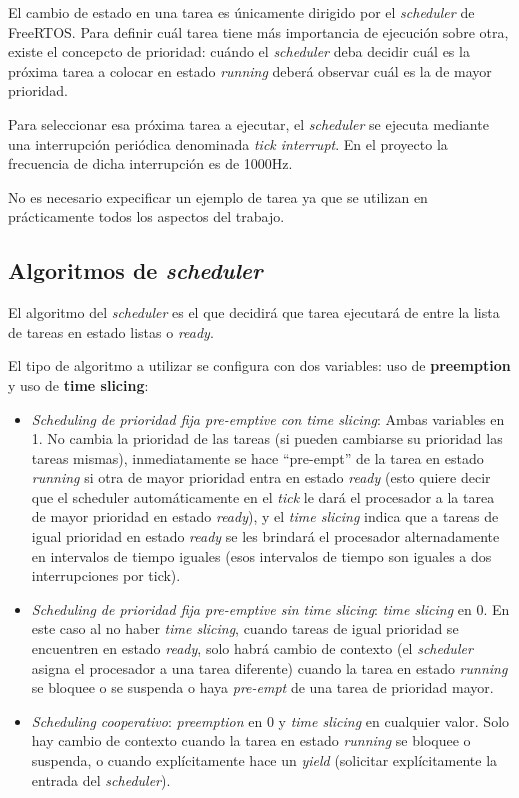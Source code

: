 \documentclass{IEEEtran}
\begin{document}
El cambio de estado en una tarea es únicamente dirigido por el \textit{scheduler} de FreeRTOS. Para definir cuál tarea tiene más importancia de ejecución sobre otra, existe el concepcto de prioridad: cuándo el \textit{scheduler} deba decidir cuál es la próxima tarea a colocar en estado \textit{running} deberá observar cuál es la de mayor prioridad.

Para seleccionar esa próxima tarea a ejecutar, el \textit{scheduler} se ejecuta mediante una interrupción periódica denominada \textit{tick interrupt}. En el proyecto la frecuencia de dicha interrupción es de 1000Hz.

No es necesario expecificar un ejemplo de tarea ya que se utilizan en prácticamente todos los aspectos del trabajo.

\subsection{Algoritmos de \textit{scheduler}}
El algoritmo del \textit{scheduler} es el que decidirá que tarea ejecutará de entre la lista de tareas en estado listas o \textit{ready}.

El tipo de algoritmo a utilizar se configura con dos variables: uso de \textbf{preemption} y uso de \textbf{time slicing}:

\begin{itemize}
    \item \textit{Scheduling de prioridad fija pre-emptive con time slicing}: Ambas variables en 1. No cambia la prioridad de las tareas (si pueden cambiarse su prioridad las tareas mismas), inmediatamente se hace ``pre-empt'' de la tarea en estado \textit{running} si otra de mayor prioridad entra en estado \textit{ready} (esto quiere decir que el scheduler automáticamente en el \textit{tick} le dará el procesador a la tarea de mayor prioridad en estado \textit{ready}), y el \textit{time slicing} indica que a tareas de igual prioridad en estado \textit{ready} se les brindará el procesador alternadamente en intervalos de tiempo iguales (esos intervalos de tiempo son iguales a dos interrupciones por tick).
    \item \textit{Scheduling de prioridad fija pre-emptive sin time slicing}: \textit{time slicing} en 0. En este caso al no haber \textit{time slicing}, cuando tareas de igual prioridad se encuentren en estado \textit{ready}, solo habrá cambio de contexto (el \textit{scheduler} asigna el procesador a una tarea diferente) cuando la tarea en estado \textit{running} se bloquee o se suspenda o haya \textit{pre-empt} de una tarea de prioridad mayor.
    \item \textit{Scheduling cooperativo}: \textit{preemption} en 0 y \textit{time slicing} en cualquier valor. Solo hay cambio de contexto cuando la tarea en estado \textit{running} se bloquee o suspenda, o cuando explícitamente hace un \textit{yield} (solicitar explícitamente la entrada del \textit{scheduler}).
\end{itemize}
\end{document}

